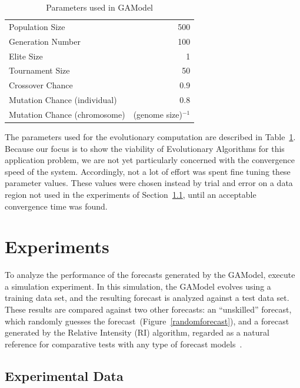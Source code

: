 \documentclass[a4paper,twoside]{article}
\begin{document}
\begin{table}[!ht]
  \caption{Parameters used in GAModel}
  \label{GAParameters}
  \begin{center}
  \begin{tabular}{|l|r|}
    \hline
    Population Size & 500\\
    Generation Number & 100\\
    Elite Size & 1\\
    Tournament Size & 50\\
    Crossover Chance & 0.9\\
    Mutation Chance (individual) & 0.8\\
    Mutation Chance (chromosome) & (genome size)$^{-1}$\\
    \hline    
  \end{tabular}
  \end{center}
\end{table}

The parameters used for the evolutionary computation are described in
Table~\ref{GAParameters}. Because our focus is to show the viability
of Evolutionary Algorithms for this application problem, we are not
yet particularly concerned with the convergence speed of the
system. Accordingly, not a lot of effort was spent fine tuning these
parameter values. These values were chosen instead by trial and error
on a data region not used in the experiments of Section~\ref{data},
until an acceptable convergence time was found.

\section{Experiments}

To analyze the performance of the forecasts generated by the GAModel,
execute a simulation experiment. In this simulation, the GAModel
evolves using a training data set, and the resulting forecast is
analyzed against a test data set. These results are compared against
two other forecasts: an ``unskilled'' forecast, which randomly guesses
the forecast~(Figure~\ref{randomforecast}), and a forecast generated by the
Relative Intensity (RI) algorithm, regarded as a natural reference for
comparative tests with any type of forecast models~\cite{Nanjo2011}.

\subsection{Experimental Data}\label{data}
\end{document}
